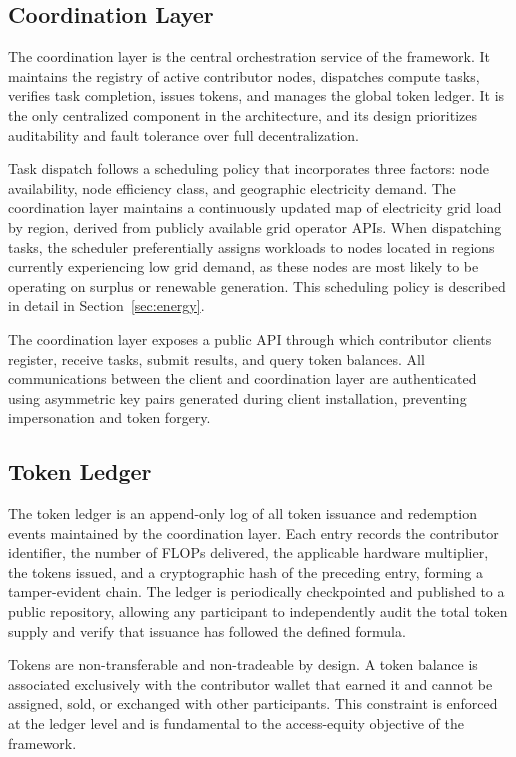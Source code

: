 \documentclass[12pt]{article}
\begin{document}
\subsection{Coordination Layer}

The coordination layer is the central orchestration service of the framework. It maintains the registry of active contributor nodes, dispatches compute tasks, verifies task completion, issues tokens, and manages the global token ledger. It is the only centralized component in the architecture, and its design prioritizes auditability and fault tolerance over full decentralization.

Task dispatch follows a scheduling policy that incorporates three factors: node availability, node efficiency class, and geographic electricity demand. The coordination layer maintains a continuously updated map of electricity grid load by region, derived from publicly available grid operator APIs. When dispatching tasks, the scheduler preferentially assigns workloads to nodes located in regions currently experiencing low grid demand, as these nodes are most likely to be operating on surplus or renewable generation. This scheduling policy is described in detail in Section~\ref{sec:energy}.

The coordination layer exposes a public API through which contributor clients register, receive tasks, submit results, and query token balances. All communications between the client and coordination layer are authenticated using asymmetric key pairs generated during client installation, preventing impersonation and token forgery.

\subsection{Token Ledger}

The token ledger is an append-only log of all token issuance and redemption events maintained by the coordination layer. Each entry records the contributor identifier, the number of FLOPs delivered, the applicable hardware multiplier, the tokens issued, and a cryptographic hash of the preceding entry, forming a tamper-evident chain. The ledger is periodically checkpointed and published to a public repository, allowing any participant to independently audit the total token supply and verify that issuance has followed the defined formula.

Tokens are non-transferable and non-tradeable by design. A token balance is associated exclusively with the contributor wallet that earned it and cannot be assigned, sold, or exchanged with other participants. This constraint is enforced at the ledger level and is fundamental to the access-equity objective of the framework.
\end{document}
